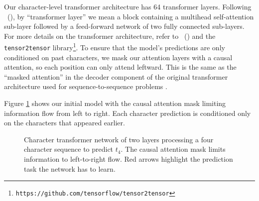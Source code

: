 \documentclass[letterpaper]{article}
\newcommand{\newcite}[1]{\citeauthor{#1}~(\citeyear{#1})}
\begin{document}
Our character-level transformer architecture has 64 transformer layers.
Following \newcite{NIPS2017_7181}, by ``transformer layer'' we mean a block containing a multihead self-attention sub-layer followed by a feed-forward network of two fully connected sub-layers.
For more details on the transformer architecture, refer to \newcite{NIPS2017_7181} and the \texttt{tensor2tensor} library\footnote{\texttt{https://github.com/tensorflow/tensor2tensor}}.
To ensure that the model's predictions are only conditioned on past characters, we mask our attention layers with a causal attention, so each position can only attend leftward.
This is the same as the ``masked attention'' in the decoder component of the original transformer architecture used for sequence-to-sequence problems \cite{NIPS2017_7181}.

Figure \ref{figure:transformer} shows our initial model with the causal attention mask limiting information flow from left to right.
Each character prediction is conditioned only on the characters that appeared earlier.

\begin{figure}[htb]
  \centering
  \caption{Character transformer network of two layers processing a four character sequence to predict $t_4$. The causal attention mask limits information to left-to-right flow. Red arrows highlight the prediction task the network has to learn.}
  \label{figure:transformer}
\end{figure} 
\end{document}

